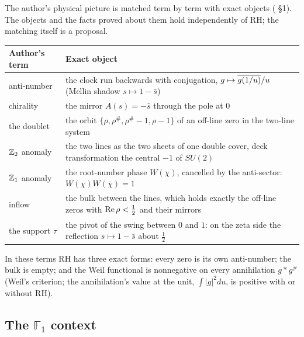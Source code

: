 The author's physical picture is matched term by term with exact objects ( §1). The objects and the facts proved about them hold independently of RH; the matching itself is a proposal.
\begin{center}\small
\begin{tabularx}{\linewidth}{@{}l X@{}}
\toprule
Author's term & Exact object\\
\midrule
anti-number & the clock run backwards with conjugation, $g\mapsto\overline{g(1/u)}/u$ (Mellin shadow $s\mapsto1-\bar s$)\\
chirality & the mirror $A(s)=-\bar s$ through the pole at $0$\\
the doublet & the orbit $\{\rho,\rho^\#,\rho^\#-1,\rho-1\}$ of an off-line zero in the two-line system\\
$\mathbb{Z}_2$ anomaly & the two lines as the two sheets of one double cover, deck transformation the central $-1$ of $SU(2)$\\
$\mathbb{Z}_1$ anomaly & the root-number phase $W(\chi)$, cancelled by the anti-sector: $W(\chi)W(\bar\chi)=1$\\
inflow & the bulk between the lines, which holds exactly the off-line zeros with $\operatorname{Re}\rho<\tfrac12$ and their mirrors\\
the support $\tau$ & the pivot of the swing between $0$ and $1$: on the zeta side the reflection $s\mapsto1-\bar s$ about $\tfrac12$\\
\bottomrule
\end{tabularx}
\end{center}
In these terms RH has three exact forms: every zero is its own anti-number; the bulk is empty; and the Weil functional is nonnegative on every annihilation $g*g^\#$ (Weil's criterion; the annihilation's value at the unit, $\int|g|^2du$, is positive with or without RH).

\subsection{The $\mathbb{F}_1$ context}


